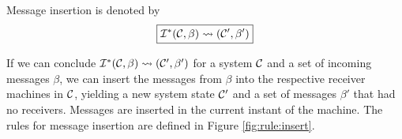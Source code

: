 \clearpage

Message insertion is denoted by
\begin{equation*}
\boxed{\mathcal{I}^*(\mathcal{C}, \beta) \leadsto (\mathcal{C}', \beta')}
\end{equation*}

If we can conclude $\mathcal{I}^*(\mathcal{C}, \beta) \leadsto (\mathcal{C}', \beta')$ for a system $\mathcal{C}$ and
a set of incoming messages $\beta$, we can insert the messages from $\beta$
into the respective receiver machines in $\mathcal{C}$, yielding a new system state
$\mathcal{C}'$ and a set of messages $\beta'$ that had no receivers. Messages are
inserted in the current instant of the machine. The rules for message insertion
are defined in Figure \ref{fig:rule:insert}.

\begin{figure}[!ht]
\end{figure}
